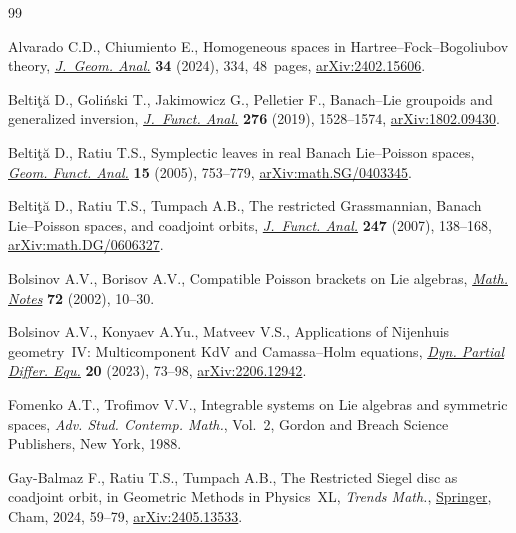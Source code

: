 \documentclass[pdftex]{sigma}
\theoremstyle{definition}
\numberwithin{equation}{section}
\begin{document}
\begin{thebibliography}{99}
\footnotesize\itemsep=0pt

Alvarado C.D., Chiumiento E., Homogeneous spaces in
 {H}artree--{F}ock--{B}ogoliubov theory, \href{https://doi.org/10.1007/s12220-024-01776-6}{\textit{J.~Geom. Anal.}} \textbf{34}
 (2024), 334, 48~pages, \href{https://arxiv.org/abs/2402.15606}{arXiv:2402.15606}.

Belti\c{t}\u{a} D., Goli\'nski T., Jakimowicz G., Pelletier F., Banach--{L}ie
 groupoids and generalized inversion, \href{https://doi.org/10.1016/j.jfa.2018.12.002}{\textit{J.~Funct. Anal.}} \textbf{276}
 (2019), 1528--1574, \href{https://arxiv.org/abs/1802.09430}{arXiv:1802.09430}.

Belti\c{t}\u{a} D., Ratiu T.S., Symplectic leaves in real {B}anach
 {L}ie--{P}oisson spaces, \href{https://doi.org/10.1007/s00039-005-0524-9}{\textit{Geom. Funct. Anal.}} \textbf{15} (2005),
 753--779, \href{https://arxiv.org/abs/math.SG/0403345}{arXiv:math.SG/0403345}.

Belti\c{t}\u{a} D., Ratiu T.S., Tumpach A.B., The restricted {G}rassmannian,
 {B}anach {L}ie--{P}oisson spaces, and coadjoint orbits, \href{https://doi.org/10.1016/j.jfa.2007.03.001}{\textit{J.~Funct.
 Anal.}} \textbf{247} (2007), 138--168, \href{https://arxiv.org/abs/math.DG/0606327}{arXiv:math.DG/0606327}.

Bolsinov A.V., Borisov A.V., Compatible {P}oisson brackets on {L}ie algebras,
 \href{https://doi.org/10.1023/A:1019856702638}{\textit{Math. Notes}} \textbf{72} (2002), 10--30.

Bolsinov A.V., Konyaev A.Yu., Matveev V.S., Applications of {N}ijenhuis
 geometry~{IV}: {M}ulticomponent {K}d{V} and {C}amassa--{H}olm equations,
 \href{https://doi.org/10.4310/dpde.2023.v20.n1.a4}{\textit{Dyn. Partial Differ. Equ.}} \textbf{20} (2023), 73--98,
 \href{https://arxiv.org/abs/2206.12942}{arXiv:2206.12942}.

Fomenko A.T., Trofimov V.V., Integrable systems on {L}ie algebras and symmetric
 spaces, \textit{Adv. Stud. Contemp. Math.}, Vol.~2, Gordon and Breach Science
 Publishers, New York, 1988.

Gay-Balmaz F., Ratiu T.S., Tumpach A.B., The {R}estricted {S}iegel disc as
 coadjoint orbit, in Geometric {M}ethods in {P}hysics~{XL}, \textit{Trends Math.},
 \href{https://doi.org/10.1007/978-3-031-62407-0_6}{Springer}, Cham, 2024, 59--79, \href{https://arxiv.org/abs/2405.13533}{arXiv:2405.13533}.


\end{thebibliography}
\end{document}
